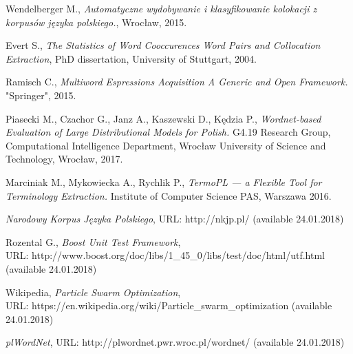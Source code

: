 \begin{thebibliography}{9}

Wendelberger M., 
\textit{Automatyczne wydobywanie i klasyfikowanie kolokacji z korpusów języka polskiego.}, 
Wrocław, 2015.

Evert S.,
\textit{The Statistics of Word Cooccurences Word Pairs and Collocation Extraction}, 
PhD dissertation, University of Stuttgart, 2004.

Ramisch C., 
\textit{Multiword Espressions Acquisition A Generic and Open Framework.} 
"Springer", 2015.

Piasecki M., Czachor G., Janz A., Kaszewski D., Kędzia P.,
\textit{Wordnet-based Evaluation of Large Distributional Models for Polish.} 
G4.19 Research Group, Computational Intelligence Department, Wrocław University of Science and Technology, Wrocław, 2017.

Marciniak M., Mykowiecka A., Rychlik P.,
\textit{TermoPL — a Flexible Tool for Terminology Extraction.} 
Institute of Computer Science PAS, Warszawa 2016.

\textit{Narodowy Korpus Języka Polskiego}, 
URL: http://nkjp.pl/ (available 24.01.2018)

Rozental G., \textit{Boost Unit Test Framework}, \\
URL: http://www.boost.org/doc/libs/1\_45\_0/libs/test/doc/html/utf.html (available 24.01.2018)

Wikipedia, \textit{Particle Swarm Optimization}, \\
URL: https://en.wikipedia.org/wiki/Particle\_swarm\_optimization (available 24.01.2018)


\textit{plWordNet}, 
URL: http://plwordnet.pwr.wroc.pl/wordnet/ (available 24.01.2018)





\end{thebibliography}